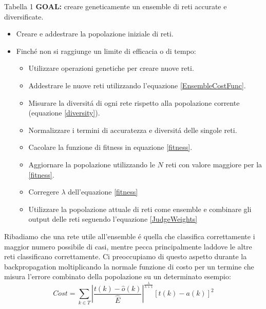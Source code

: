 \documentclass[a4paper,10pt]{article}
\begin{document}
  Tabella 1
  \textbf{GOAL:} creare geneticamente un ensemble di reti accurate e diversificate.
  \begin{itemize}
   \item Creare e addestrare la popolazione iniziale di reti.
   \item Finch\'e non si raggiunge un limite di efficacia o di tempo:
   \begin{itemize}
    \item Utilizzare operazioni genetiche per creare nuove reti.
    \item Addestrare le nuove reti utilizzando l'equazione \ref{EnsembleCostFunc}.
    \item Misurare la diversit\'a di ogni rete rispetto alla popolazione corrente (equazione \ref{diversity}).
    \item Normalizzare i termini di accuratezza e diversit\'a delle singole reti.
    \item Cacolare la funzione di fitness in equazione \ref{fitness}.
    \item Aggiornare la popolazione utilizzando le $N$ reti con valore maggiore per la \ref{fitness}.
    \item Corregere $\lambda$ dell'equazione \ref{fitness}
    \item Utilizzare la popolazione attuale di reti come ensemble e combinare gli output delle reti seguendo l'equazione \ref{JudgeWeights}
   \end{itemize}
  \end{itemize}
  Ribadiamo che una rete utile all'ensemble \'e quella che classifica correttamente i maggior numero possibile di casi, mentre pecca principalmente laddove le altre reti classificano correttamente. Ci preoccupiamo di questo aspetto durante la backpropagation moltiplicando la normale funzione di costo per un termine che misura l'errore combinato della popolazione su un determinato esempio:
  \begin{equation}
   Cost = \sum_{k \in T} \left| \frac{t \left(k\right) - \hat{o} \left(k\right)}{\hat{E}} \right|^{\frac{\lambda}{\lambda + 1}} \left[ t\left(k\right) - a\left(k\right) \right]^2 \label{EnsembleCostFunc}
  \end{equation}
\end{document}
